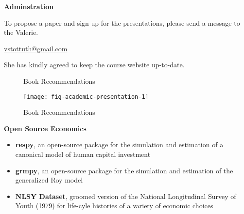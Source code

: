 \begin{frame}
	\textbf{Adminstration}\vspace{0.3cm}

To propose a paper and sign up for the presentations, please send a message to the Valerie.

\begin{center}
\href{mailto:vstottuth@gmail.com}{vstottuth@gmail.com}
\end{center}

She has kindly agreed to keep the course website up-to-date.

\end{frame}
\begin{frame}
	\begin{figure}
		\caption{Book Recommendations}
		\centering
		\hspace{25pt}
	\end{figure}
\end{frame}
\begin{frame}
	\begin{figure}
		\caption{Book Recommendations}
		\centering
		\texttt{[image: fig-academic-presentation-1]}
	\end{figure}
\end{frame}
\begin{frame}\textbf{Open Source Economics}\vspace{0.3cm}

\begin{itemize}\setlength\itemsep{1em}
\item \textbf{respy}, an open-source package for the simulation and estimation of a canonical model of human capital investment
\item \textbf{grmpy}, an open-source package for the simulation and estimation of the generalized Roy model
\item \textbf{NLSY Dataset}, groomed version of the National Longitudinal Survey of Youth (1979) for life-cyle histories of a variety of economic choices
\end{itemize}

\end{frame}
